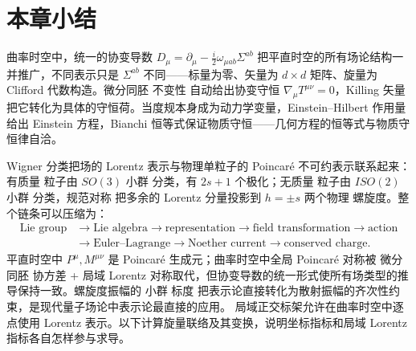 \section*{本章小结}

曲率时空中，统一的协变导数 $D_\mu=\partial_\mu-\frac{i}{2}\omega_{\mu ab}\Sigma^{ab}$ 把平直时空的所有场论结构一并推广，不同表示只是 $\Sigma^{ab}$ 不同——标量为零、矢量为 $d\times d$ 矩阵、旋量为 Clifford 代数构造。微分同胚 不变性 自动给出协变守恒 $\nabla_\mu T^{\mu\nu}=0$，Killing 矢量把它转化为具体的守恒荷。当度规本身成为动力学变量，Einstein--Hilbert 作用量给出 Einstein 方程，Bianchi 恒等式保证物质守恒——几何方程的恒等式与物质守恒律自洽。

Wigner 分类把场的 Lorentz 表示与物理单粒子的 Poincaré 不可约表示联系起来：有质量 粒子由 $SO(3)$ 小群 分类，有 $2s+1$ 个极化；无质量 粒子由 $ISO(2)$ 小群 分类，规范对称 把多余的 Lorentz 分量投影到 $h=\pm s$ 两个物理 螺旋度。整个链条可以压缩为：
\begin{align*}
\text{Lie group}&\to\text{Lie algebra}\to\text{representation}
\to\text{field transformation}\to\text{action}\\
&\to\text{Euler--Lagrange}\to\text{Noether current}
\to\text{conserved charge}.
\end{align*}
平直时空中 $P^\mu,M^{\mu\nu}$ 是 Poincaré 生成元；曲率时空中全局 Poincaré 对称被 微分同胚 协方差 + 局域 Lorentz 对称取代，但协变导数的统一形式使所有场类型的推导保持一致。螺旋度振幅的 小群 标度 把表示论直接转化为散射振幅的齐次性约束，是现代量子场论中表示论最直接的应用。
局域正交标架允许在曲率时空中逐点使用 Lorentz 表示。以下计算旋量联络及其变换，说明坐标指标和局域 Lorentz 指标各自怎样参与求导。




